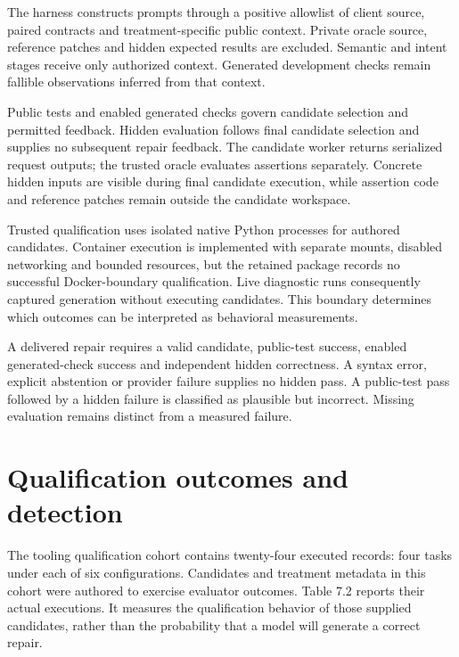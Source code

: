 \documentclass[12pt,a4paper,oneside]{report}
\begin{document}
The harness constructs prompts through a positive allowlist of client source, paired contracts and treatment-specific public context. Private oracle source, reference patches and hidden expected results are excluded. Semantic and intent stages receive only authorized context. Generated development checks remain fallible observations inferred from that context.

Public tests and enabled generated checks govern candidate selection and permitted feedback. Hidden evaluation follows final candidate selection and supplies no subsequent repair feedback. The candidate worker returns serialized request outputs; the trusted oracle evaluates assertions separately. Concrete hidden inputs are visible during final candidate execution, while assertion code and reference patches remain outside the candidate workspace.

Trusted qualification uses isolated native Python processes for authored candidates. Container execution is implemented with separate mounts, disabled networking and bounded resources, but the retained package records no successful Docker-boundary qualification. Live diagnostic runs consequently captured generation without executing candidates. This boundary determines which outcomes can be interpreted as behavioral measurements.

A delivered repair requires a valid candidate, public-test success, enabled generated-check success and independent hidden correctness. A syntax error, explicit abstention or provider failure supplies no hidden pass. A public-test pass followed by a hidden failure is classified as plausible but incorrect. Missing evaluation remains distinct from a measured failure.

\section{Qualification outcomes and detection}

The tooling qualification cohort contains twenty-four executed records: four tasks under each of six configurations. Candidates and treatment metadata in this cohort were authored to exercise evaluator outcomes. Table 7.2 reports their actual executions. It measures the qualification behavior of those supplied candidates, rather than the probability that a model will generate a correct repair.
\end{document}
